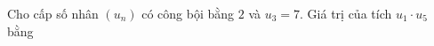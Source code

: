 \begin{ex}
Cho cấp số nhân $(u_n)$ có công bội bằng $2$ và $u_3=7$. Giá trị của tích $u_1\cdot u_5$ bằng
\end{ex}
